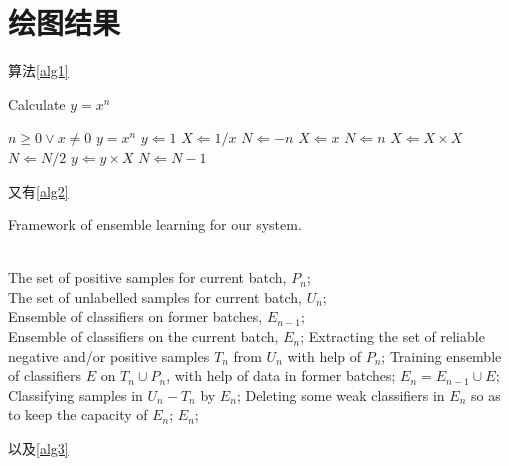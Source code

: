 \documentclass[UTF8,12px,a4paper]{ctexart} %
\numberwithin{equation}{section} %
\begin{document}
\section{\heiti 绘图结果}
算法\ref{alg1}
\begin{algorithm}
\caption{Calculate $y = x^n$}
\label{alg1}
\begin{algorithmic}[1] %
\REQUIRE $n \geq 0 \vee x \neq 0$
\ENSURE $y = x^n$
\STATE $y \Leftarrow 1$
\STATE $X \Leftarrow 1 / x$
\STATE $N \Leftarrow -n$
\ELSE
\STATE $X \Leftarrow x$
\STATE $N \Leftarrow n$
\ENDIF
{}
\STATE $X \Leftarrow X \times X$
\STATE $N \Leftarrow N / 2$
\ELSE[$N$ is odd]
\STATE $y \Leftarrow y \times X$
\STATE $N \Leftarrow N - 1$
\ENDIF
\ENDWHILE
\end{algorithmic}
\end{algorithm}
又有\ref{alg2}
    \begin{algorithm}[t]
    \caption{ Framework of ensemble learning for our system.}
    \label{alg2}
    \begin{algorithmic}
     \\ %
    The set of positive samples for current batch, $P_n$;\\
    The set of unlabelled samples for current batch, $U_n$;\\
    Ensemble of classifiers on former batches, $E_{n-1}$;
     \\ %
    Ensemble of classifiers on the current batch, $E_n$;
    \STATE Extracting the set of reliable negative and/or positive samples $T_n$ from $U_n$ with help of $P_n$;
    \label{ code:fram:extract }%
    \STATE Training ensemble of classifiers $E$ on $T_n \cup P_n$, with help of data in former batches;
    \label{code:fram:trainbase}
    \STATE $E_n=E_{n-1}\cup E$;
    \label{code:fram:add}
    \STATE Classifying samples in $U_n-T_n$ by $E_n$;
    \label{code:fram:classify}
    \STATE Deleting some weak classifiers in $E_n$ so as to keep the capacity of $E_n$;
    \label{code:fram:select}
    \RETURN $E_n$; %
    \end{algorithmic}
    \end{algorithm}
以及\ref{alg3}
\end{document}
